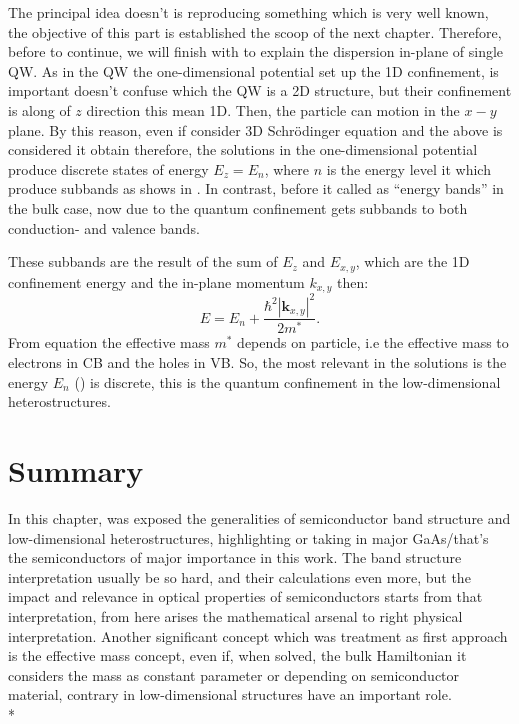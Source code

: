The principal idea doesn't is reproducing something which is very well known, the objective of this part is established the scoop of the next chapter. Therefore,  before to continue, we will finish with to explain the dispersion in-plane of single QW. As in the QW the one-dimensional potential set up the 1D confinement, is important doesn't confuse which the QW is a 2D structure, but their confinement is along of $z$ direction  this mean 1D. Then, the particle can motion in the $x-y$ plane. By this reason, even if consider 3D Schrödinger equation and  the above is considered it obtain 
therefore, the solutions in the one-dimensional potential produce discrete states of energy $E_{z}=E_{n}$\cite{harrison2016quantum}, where $n$ is the energy level it which produce  subbands as shows in . In contrast, before it called as ``energy bands'' in the bulk case, now due to the quantum confinement gets subbands to both conduction- and valence bands.

These subbands are the result of the sum of $E_{z}$ and $E_{x,y}$, which are the 1D confinement energy and the in-plane momentum $k_{x,y}$ then\cite{harrison2016quantum}:
\begin{equation}\label{eqn:chapter-1-total-enery-ema-aprox}		
	E = E_{n} + \dfrac{\hbar^{2}|\boldsymbol{k}_{x,y}|^{2}}{2m^{*}}.
\end{equation}  
From equation the effective mass  $m^*$ depends on particle, i.e the effective mass to electrons in CB and the holes in VB. So, the most relevant in the solutions is the energy $E_{n}$ ()  is discrete, this is the quantum confinement in the low-dimensional heterostructures. 


\section{Summary}
\vspace{-10mm} 
In this chapter, was exposed the generalities of semiconductor band structure and low-dimensional heterostructures, highlighting or taking in major GaAs/\algaas that's the semiconductors of major importance in this work. 
The band structure interpretation  usually be so hard, and their calculations even more, but the impact and relevance in optical properties of semiconductors starts from that interpretation, from here arises the mathematical arsenal to right physical interpretation. Another significant concept which was treatment as first approach is the effective mass concept, even if, when solved, the bulk Hamiltonian it considers the mass as constant parameter or depending on semiconductor material, contrary  in low-dimensional structures have an important role.  \\*

